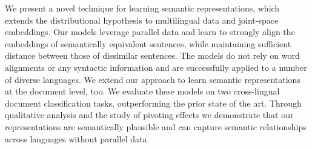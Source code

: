 We present a novel technique for learning semantic representations, which extends the distributional hypothesis to multilingual data and joint-space embeddings. Our models leverage parallel data and learn to strongly align the embeddings of semantically equivalent sentences, while maintaining sufficient distance between those of dissimilar sentences. The models do not rely on word alignments or any syntactic information and are successfully applied to a number of diverse languages. We extend our approach to learn semantic representations at the document level, too. We evaluate these models on two cross-lingual document classification tasks, outperforming the prior state of the art. Through qualitative analysis and the study of pivoting effects we demonstrate that our representations are semantically plausible and can capture semantic relationships across languages without parallel data.
